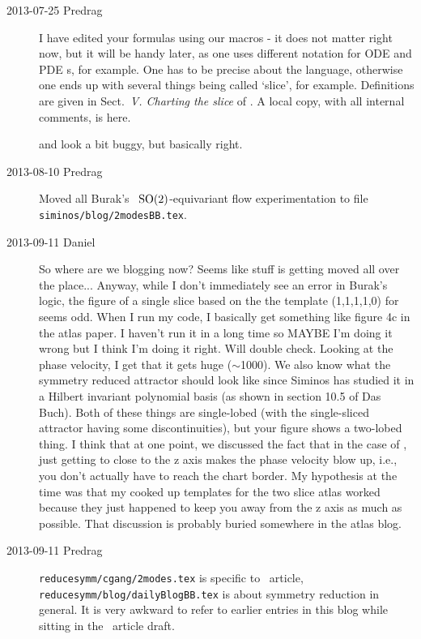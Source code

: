 \begin{description}

\item[2013-07-25  Predrag]
I have edited your formulas using our macros - it does not matter right
now, but it will be handy later, as one uses different notation for ODE
and PDE \statesp s, for example. One has to be precise about the
language, otherwise one ends up with several things being called `slice',
for example. Definitions are given in Sect.~\emph{V. Charting the slice}
of . A local copy, with all internal comments, is
 {here}.

 and  look
a bit buggy, but basically right.

\item[2013-08-10  Predrag] Moved all Burak's
\twoMode\ $\textrm{SO}(2)$-equivariant flow experimentation to file
\texttt{siminos/blog/2modesBB.tex}.

\item[2013-09-11 Daniel] So where are we blogging now? Seems like
stuff is getting moved all over the place... Anyway, while I don't
immediately see an error in Burak's logic, the figure of a single
slice based on the the template (1,1,1,1,0) for \cLf\, seems odd.
When I run my code, I basically get something like figure 4c in the
atlas paper. I haven't run it in a long time so MAYBE I'm doing it
wrong but I think I'm doing it right. Will double check. Looking at
the phase velocity, I get that it gets huge ($\sim$1000). We also
know what the symmetry reduced attractor should look like since
Siminos has studied it in a Hilbert invariant polynomial basis (as
shown in section 10.5 of Das Buch). Both of these things are
single-lobed (with the single-sliced attractor having some
discontinuities), but your figure shows a two-lobed thing. I think
that at one point, we discussed the fact that in the case of \cLf,
just getting to close to the z axis makes the phase velocity blow up,
i.e., you don't actually have to reach the chart border. My
hypothesis at the time was that my cooked up templates for the two
slice atlas worked because they just happened to keep you away from
the z axis as much as possible. That discussion is probably buried
somewhere in the atlas blog.

\item[2013-09-11 Predrag]
\texttt{reducesymm/cgang/2modes.tex} is specific to \twoMode\ article,
\texttt{reducesymm/blog/dailyBlogBB.tex} is about symmetry reduction
in general. It is very awkward to refer to earlier entries in this blog
while sitting in the \twoMode\ article draft.


\end{description}
